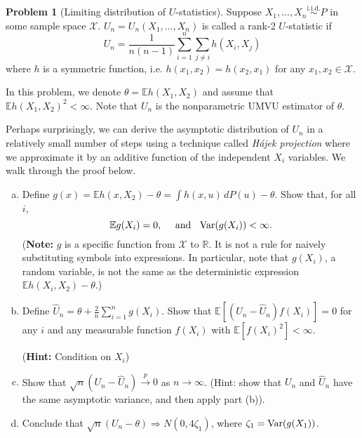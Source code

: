 \documentclass{article}
\newcommand{\cX}{\mathcal{X}}
\newcommand{\EE}{\mathbb{E}}
\newcommand{\RR}{\mathbb{R}}
\newcommand{\Var}{\textnormal{Var}}
\newcommand{\toProb}{\overset{p}{\to}}
\newcommand{\simiid}{\overset{\text{i.i.d.}}{\sim}}
\theoremstyle{definition}
\newtheorem{problem}{Problem}
\begin{document}
\begin{problem}[Limiting distribution of $U$-statistics]

Suppose $X_{1}, \ldots, X_{n} \simiid P$ in some sample space $\cX$. $U_{n} = U_{n}(X_{1}, \ldots, X_{n})$ is called a rank-2 $U$-statistic if
\[U_{n} = \frac{1}{n(n - 1)}\sum_{i=1}^{n}\sum_{j\neq i}h(X_{i}, X_{j})\]
where $h$ is a symmetric function, i.e. $h(x_{1}, x_{2}) = h(x_{2}, x_{1})$ for any $x_{1}, x_{2}\in\cX$.

In this problem, we denote $\theta = \EE h(X_{1}, X_{2})$ and assume that $\EE h(X_{1}, X_{2})^{2} < \infty$. Note that $U_n$ is the nonparametric UMVU estimator of $\theta$.

Perhaps surprisingly, we can derive the asymptotic distribution of $U_n$ in a relatively small number of steps using a technique called {\em H\'{a}jek projection} where we approximate it by an additive function of the independent $X_i$ variables. We walk through the proof below.

\begin{enumerate}[(a)]
\item Define $g(x) = \EE h(x, X_2) - \theta = \int h(x,u)\,d P(u) - \theta$. Show that, for all $i$,
\[
\EE g(X_i) = 0, \quad \text{ and } \;\;\Var(g(X_i)) < \infty.
\]
({\bf Note:} $g$ is a specific function from $\cX$ to $\RR$. It is not a rule for naively substituting symbols into expressions. In particular, note that $g(X_i)$, a random variable, is not the same as the deterministic expression $\EE h(X_i, X_2)-\theta$.)




\item Define $\widehat{U}_{n} = \theta + \frac{2}{n}\sum_{i=1}^{n}g(X_{i})$. Show that $\EE[(U_n-\widehat{U}_n)f(X_i)]=0$ for any $i$ and any measurable function $f(X_i)$ with $\EE[f(X_i)^2] < \infty$.

({\bf Hint:} Condition on $X_i$)



\item Show that ${\sqrt{n}(U_{n} - \widehat{U}_{n})\toProb 0}$ as $n\to\infty$. (Hint: show that $U_n$ and $\widehat{U}_n$ have the same asymptotic variance, and then apply part (b)).

  



\item Conclude that $\sqrt{n}(U_{n} - \theta)\Rightarrow N(0, 4\zeta_{1})$, where $\zeta_{1} = \Var(g(X_{1}))$.





\end{enumerate}
\end{problem}
\end{document}

